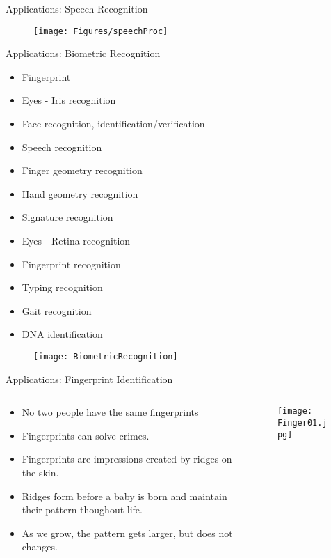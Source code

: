 \begin{frame}{Applications: Speech Recognition}
\begin{figure}
\texttt{[image: Figures/speechProc]}
\end{figure}
\end{frame}

\begin{frame}{Applications: Biometric Recognition}
\vspace{-6pt}
\begin{multicols}{2}
\begin{itemize}
\item Fingerprint
\item Eyes - Iris recognition
\item Face recognition, identification/verification
\item Speech recognition
\item Finger geometry recognition
\item Hand geometry recognition
\item Signature recognition
\item Eyes - Retina recognition
\item Fingerprint recognition
\item Typing recognition
\item Gait recognition
\item DNA identification
\end{itemize}
\end{multicols}
\begin{figure}
\texttt{[image: BiometricRecognition]}
\end{figure}
\end{frame}

\begin{frame}{Applications: Fingerprint Identification}
\begin{columns}
\begin{column}{6cm}
\begin{itemize}
\item No two people have the same fingerprints
\item Fingerprints can solve crimes.
\item Fingerprints are impressions created by ridges on the skin.
\item Ridges form before a baby is born and maintain their pattern thoughout life.
\item As we grow, the pattern gets larger, but does not changes.
\end{itemize}
\end{column}
\begin{column}{5cm}
\begin{figure}
\texttt{[image: Finger01.jpg]}
\end{figure}
\end{column}
\end{columns}
\end{frame}

